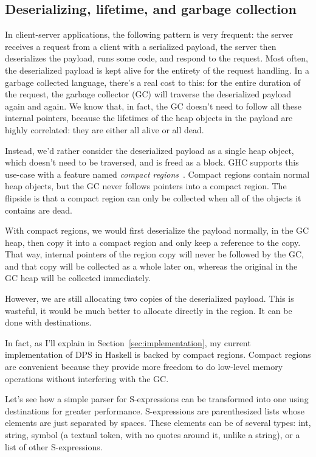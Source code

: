 \documentclass[english]{jflart}
\begin{document}
\subsection{Deserializing, lifetime, and garbage collection}\label{ssec:parser-sexpr}

In client-server applications, the following pattern is very frequent: the server receives a request from a client with a serialized payload, the server then deserializes the payload, runs some code, and respond to the request. Most often, the deserialized payload is kept alive for the entirety of the request handling. In a garbage collected language, there's a real cost to this: for the entire duration of the request, the garbage collector (GC) will traverse the deserialized payload again and again. We know that, in fact, the GC doesn't need to follow all these internal pointers, because the lifetimes of the heap objects in the payload are highly correlated: they are either all alive or all dead.

Instead, we'd rather consider the deserialized payload as a single heap object, which doesn't need to be traversed, and is freed as a block. GHC supports this use-case with a feature named \emph{compact regions}~\cite{yang_efficient_2015}. Compact regions contain normal heap objects, but the GC never follows pointers into a compact region. The flipside is that a compact region can only be collected when all of the objects it contains are dead.

With compact regions, we would first deserialize the payload normally, in the GC heap, then copy it into a compact region and only keep a reference to the copy. That way, internal pointers of the region copy will never be followed by the GC, and that copy will be collected as a whole later on, whereas the original in the GC heap will be collected immediately.

However, we are still allocating two copies of the deserialized payload. This is wasteful, it would be much better to allocate directly in the region. It can be done with destinations.

In fact, as I'll explain in Section~\ref{sec:implementation}, my current implementation of DPS in Haskell is backed by compact regions. Compact regions are convenient because they provide more freedom to do low-level memory operations without interfering with the GC.

Let's see how a simple parser for S-expressions can be transformed into one using destinations for greater performance. S-expressions are parenthesized lists whose elements are just separated by spaces. These elements can be of several types: int, string, symbol (a textual token, with no quotes around it, unlike a string), or a list of other S-expressions.
\end{document}
